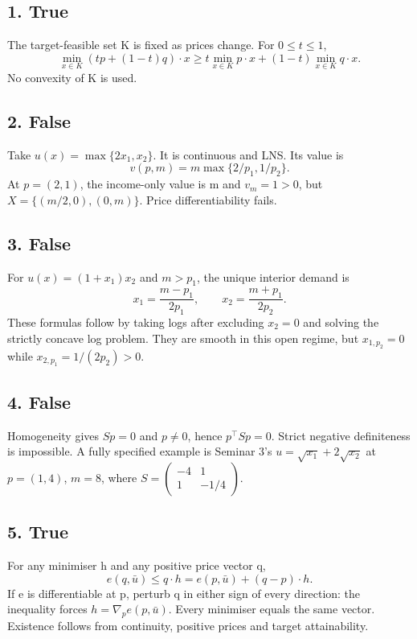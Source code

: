 \subsection*{1. True}
The target-feasible set K is fixed as prices change. For $0\le t\le1$,
\[
 \min_{x\in K}(tp+(1-t)q)\cdot x
 \ge t\min_{x\in K}p\cdot x+(1-t)\min_{x\in K}q\cdot x.
\]
No convexity of K is used.

\subsection*{2. False}
Take $u(x)=\max\{2x_1,x_2\}$. It is continuous and LNS. Its value is
\[v(p,m)=m\max\{2/p_1,1/p_2\}.\]
At $p=(2,1)$, the income-only value is m
and $v_m=1>0$, but $X=\{(m/2,0),(0,m)\}$. Price differentiability fails.

\subsection*{3. False}
For $u(x)=(1+x_1)x_2$ and $m>p_1$, the unique interior demand is
\[
 x_1=\frac{m-p_1}{2p_1},\qquad x_2=\frac{m+p_1}{2p_2}.
\]
These formulas follow by taking logs after excluding $x_2=0$ and solving the
strictly concave log problem. They are smooth in this open regime, but
$x_{1,p_2}=0$ while $x_{2,p_1}=1/(2p_2)>0$.

\subsection*{4. False}
Homogeneity gives $Sp=0$ and $p\ne0$, hence $p^\top Sp=0$. Strict negative
definiteness is impossible. A fully specified example is Seminar 3's
$u=\sqrt{x_1}+2\sqrt{x_2}$ at $p=(1,4)$, $m=8$, where
$S=\begin{pmatrix}-4&1\\1&-1/4\end{pmatrix}$.

\subsection*{5. True}
For any minimiser h and any positive price vector q,
\[
 e(q,\bar u)\le q\cdot h=e(p,\bar u)+(q-p)\cdot h.
\]
If e is differentiable at p, perturb q in either sign of every direction:
the inequality forces $h=\nabla_pe(p,\bar u)$. Every minimiser equals the
same vector. Existence follows from continuity, positive prices and target
attainability.
